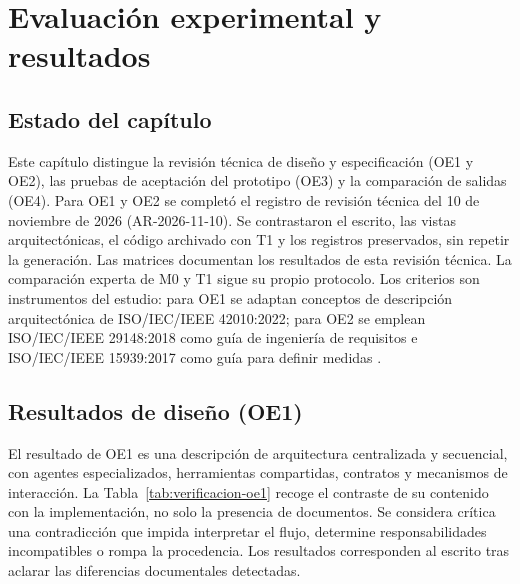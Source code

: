 \chapter{Evaluación experimental y resultados}
\label{cap:evaluacion}

\section{Estado del capítulo}

Este capítulo distingue la revisión técnica de diseño y especificación (OE1 y OE2), las pruebas de aceptación del prototipo (OE3) y la comparación de salidas (OE4). Para OE1 y OE2 se completó el registro de revisión técnica del 10 de noviembre de 2026 (AR-2026-11-10). Se contrastaron el escrito, las vistas arquitectónicas, el código archivado con T1 y los registros preservados, sin repetir la generación. Las matrices documentan los resultados de esta revisión técnica. La comparación experta de M0 y T1 sigue su propio protocolo. Los criterios son instrumentos del estudio: para OE1 se adaptan conceptos de descripción arquitectónica de ISO/IEC/IEEE 42010:2022; para OE2 se emplean ISO/IEC/IEEE 29148:2018 como guía de ingeniería de requisitos e ISO/IEC/IEEE 15939:2017 como guía para definir medidas \cite{iso42010,iso29148,iso15939}.

\section{Resultados de diseño (OE1)}

El resultado de OE1 es una descripción de arquitectura centralizada y secuencial, con agentes especializados, herramientas compartidas, contratos y mecanismos de interacción. La Tabla~\ref{tab:verificacion-oe1} recoge el contraste de su contenido con la implementación, no solo la presencia de documentos. Se considera crítica una contradicción que impida interpretar el flujo, determine responsabilidades incompatibles o rompa la procedencia. Los resultados corresponden al escrito tras aclarar las diferencias documentales detectadas.

